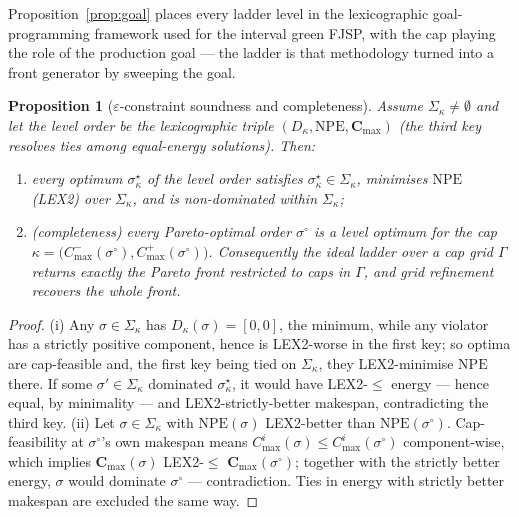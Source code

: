 \documentclass[11pt,a4paper]{article}
\newtheorem{proposition}{Proposition}
\newcommand{\NPE}{\mathrm{NPE}}
\begin{document}
Proposition~\ref{prop:goal} places every ladder level in the
lexicographic goal-programming framework used for the interval green
FJSP, with the cap playing the role of the production goal --- the ladder
is that methodology turned into a front generator by sweeping the goal.

\begin{proposition}[$\varepsilon$-constraint soundness and completeness]
\label{prop:eps}
Assume $\Sigma_\kappa\neq\emptyset$ and let the level order be the
lexicographic triple $(D_\kappa,\mathbf{\NPE},\mathbf{C}_{\max})$
(the third key resolves ties among equal-energy solutions). Then:
\begin{enumerate}
\item[(i)] every optimum $\sigma^{\star}_\kappa$ of the level order
satisfies $\sigma^{\star}_\kappa\in\Sigma_\kappa$, minimises
$\mathbf{\NPE}$ (LEX2) over $\Sigma_\kappa$, and is non-dominated
\emph{within} $\Sigma_\kappa$;
\item[(ii)] (completeness) every Pareto-optimal order $\sigma^{\circ}$
is a level optimum for the cap
$\kappa=\bigl(C^-_{\max}(\sigma^{\circ}),C^+_{\max}(\sigma^{\circ})\bigr)$.
Consequently the ideal ladder over a cap grid $\Gamma$ returns exactly
the Pareto front restricted to caps in $\Gamma$, and grid refinement
recovers the whole front.
\end{enumerate}
\end{proposition}
\begin{proof}
(i) Any $\sigma\in\Sigma_\kappa$ has $D_\kappa(\sigma)=[0,0]$, the
minimum, while any violator has a strictly positive component, hence is
LEX2-worse in the first key; so optima are cap-feasible and, the first
key being tied on $\Sigma_\kappa$, they LEX2-minimise $\mathbf{\NPE}$
there. If some $\sigma'\in\Sigma_\kappa$ dominated
$\sigma^{\star}_\kappa$, it would have LEX2-$\le$ energy — hence equal,
by minimality — and LEX2-strictly-better makespan, contradicting the
third key. (ii) Let $\sigma\in\Sigma_\kappa$ with
$\mathbf{\NPE}(\sigma)$ LEX2-better than $\mathbf{\NPE}(\sigma^{\circ})$.
Cap-feasibility at $\sigma^{\circ}$'s own makespan means
$C^i_{\max}(\sigma)\le C^i_{\max}(\sigma^{\circ})$ component-wise, which
implies $\mathbf{C}_{\max}(\sigma)$ LEX2-$\le$
$\mathbf{C}_{\max}(\sigma^{\circ})$; together with the strictly better
energy, $\sigma$ would dominate $\sigma^{\circ}$ — contradiction. Ties in
energy with strictly better makespan are excluded the same way.
\end{proof}
\end{document}
